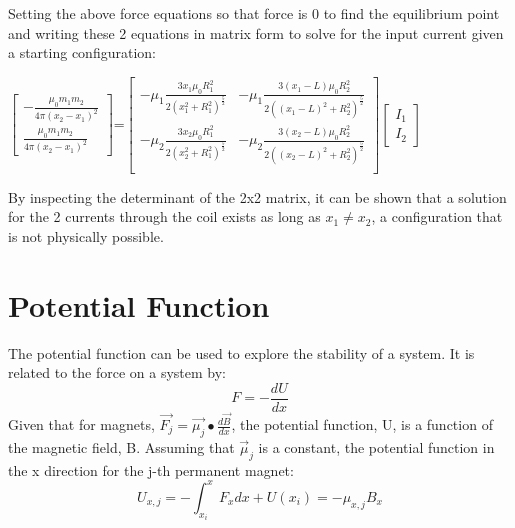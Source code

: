 \documentclass[english]{article}
\begin{document}
Setting the above force equations so that force is 0 to find the equilibrium point and writing these 2 equations in matrix form to solve for the input current given a starting configuration:

\begin{center}
$\begin{bmatrix}
	-\frac{\mu_0 m_1 m_2}{4\pi \left(x_2-x_1\right)^2} \\[0.3em]
	\frac{\mu_0m_1m_2}{4\pi \left(x_2-x_1\right)^2}	
\end{bmatrix}
$=$
\begin{bmatrix}
			-\mu_1\frac{3 x_1 \mu_0 R_{1}^{2}}{2\left(x_1^2 + R_1^2 \right)^{\frac{5}{2}}}  & -\mu_1\frac{3 \left( x_1 - L \right) \mu_0 R_{2}^{2}}{2\left(\left(x_1 - L \right)^2 + R_2^2 \right)^{\frac{5}{2}}}\\
			-\mu_2\frac{3 x_2 \mu_0 R_{1}^{2}}{2\left(x_2^2 + R_1^2 \right)^{\frac{5}{2}}} & -\mu_2\frac{3 \left( x_2 - L \right) \mu_0 R_{2}^{2}}{2\left(\left(x_2 - L \right)^2 + R_2^2 \right)^{\frac{5}{2}}}\\
\end{bmatrix}
\begin{bmatrix}
	I_1\\ I_2
\end{bmatrix}
$
\end{center}

By inspecting the determinant of the 2x2 matrix, it can be shown that a solution for the 2 currents through the coil exists as long as $x_1 \neq x_2$, a configuration that is not physically possible.

\section{Potential Function}
The potential function can be used to explore the stability of a system.  It is related to the force on a system by:
$$ F = -\frac{dU}{dx}$$
Given that for magnets, $\vec{F_j} = \vec{\mu_j} \bullet \frac{d\vec{B}}{dx}$, the potential function, U, is a function of the magnetic field, B.  Assuming that $\vec{\mu}_j$ is a constant, the potential function in the x direction for the j-th permanent magnet: \\
$$ U_{x,j} = -\int_{x_i}^{x} F_x dx + U(x_i) = - \mu_{x,j}B_x$$

%
\end{document}
